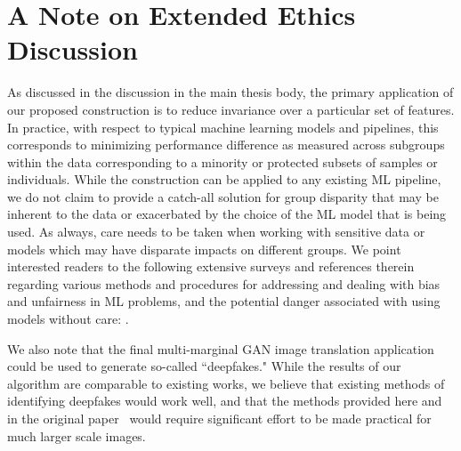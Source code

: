 \section{A Note on Extended Ethics Discussion}

As discussed in the discussion in the main thesis body,
the primary application of our proposed construction is to reduce invariance over a particular set of features. In practice, with respect to typical machine learning models and pipelines, 
this corresponds to minimizing performance difference as measured across subgroups within the data corresponding to a minority or protected subsets of samples or individuals.
While the construction can be applied to 
any existing ML pipeline,
we do not claim to provide a catch-all solution for group disparity that may be inherent to the data or exacerbated by the choice of the ML model that is being used.
As always, care needs to be taken when working with sensitive data or models which may have disparate impacts on different groups.
We point interested readers to the following extensive surveys and references therein regarding various methods and procedures for addressing and dealing with bias and unfairness in ML problems, and the potential danger associated with using models without care: \citep{mehrabi2021survey,leavy2018gender,o2016weapons,d2017conscientious,rakova2021responsible}.

We also note that the final multi-marginal GAN image translation application could be used to generate so-called ``deepfakes." 
While the results of our algorithm are comparable to existing works, we believe that existing methods of identifying deepfakes would work well, and that the methods provided here and in the original paper~\citep{cao2019multi} would require significant effort to be made practical for much larger scale images.